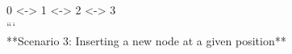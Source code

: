 \documentclass[preview]{standalone}
\begin{document}
0 <-> 1 <-> 2 <-> 3\\```\\**Scenario 3: Inserting a new node at a given position**\\
\end{document}
